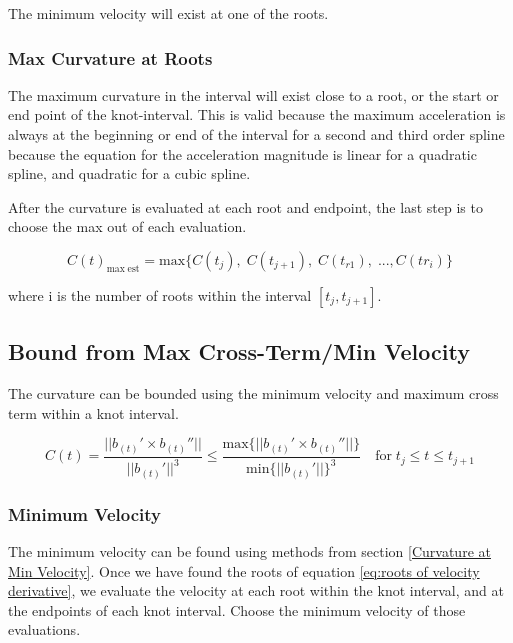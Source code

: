 \documentclass{article}
\begin{document}
The minimum velocity will exist at one of the roots.

\subsubsection{Max Curvature at Roots}

The maximum curvature in the interval will exist close to a root, or the start or end point of the knot-interval. This is valid because the maximum acceleration is always at the beginning or end of the interval for a second and third order spline because the equation for the acceleration magnitude is linear for a quadratic spline, and quadratic for a cubic spline. 

 After the curvature is evaluated at each root and endpoint, the last step is to choose the max out of each evaluation.

\begin{equation}
    C(t)_{\text{max} \; \text{est}} = \text{max}\{C(t_j),\; C(t_{j+1}), \; C(t_{r1}),\; ... ,C(t{r_i})\} 
\end{equation}

where i is the number of roots within the interval \([t_j , t_{j+1}]\).

\subsection{Bound from Max Cross-Term/Min Velocity}

The curvature can be bounded using the minimum velocity and maximum cross term within a knot interval. 

\begin{equation} 
    C(t) = \frac{||b_{(t)}' \times b_{(t)}''||}{||b_{(t)}'||^3} \leq \frac{\text{max}\{||b_{(t)}' \times b_{(t)}''||\}}{\text{min}\{||b_{(t)}'||\}^3} \quad \text{for} \; t_j \leq t \leq t_{j+1}
\end{equation}

\subsubsection{Minimum Velocity}

The minimum velocity can be found using methods from section \ref{Curvature at Min Velocity}. Once we have found the roots of equation \ref{eq:roots of velocity derivative}, we evaluate the velocity at each root within the knot interval, and at the endpoints of each knot interval. Choose the minimum velocity of those evaluations.
\end{document}

